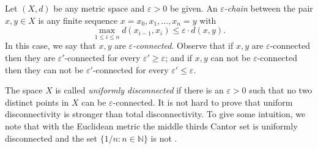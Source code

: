 Let \( (X,d) \) be any metric space and \( \varepsilon > 0 \) be given. An \emph{\( \varepsilon \)-chain} between the pair \( x,y \in X \) is any finite sequence \( x = x_0 , x_1, \hdots , x_{n} = y \) with \[\max_{1 \leq i \leq n} d(x_{i-1} , x_{i}) \leq \varepsilon \cdot d(x,y). \] In this case, we say that \( x, y \) are \emph{\( \varepsilon \)-connected}. Observe that if \( x, y \) are \( \varepsilon \)-connected then they are \( \varepsilon ' \)-connected for every \( \varepsilon ' \geq \varepsilon \); and if \( x, y \) can not be \( \varepsilon \)-connected then they can not be \( \varepsilon ' \)-connected for every \( \varepsilon ' \leq \varepsilon \).


The space \( X \) is called \emph{uniformly disconnected} if there is an \( \varepsilon > 0 \) such that no two distinct points in \( X \) can be \( \varepsilon \)-connected. It is not hard to prove that uniform disconnectivity is stronger than total disconnectivity. To give some intuition, we note that with the Euclidean metric the middle thirds Cantor set is uniformly disconnected and the set \( \{ 1/n : n \in \mathbb{N} \} \) is not \cite{metric:2001}.


